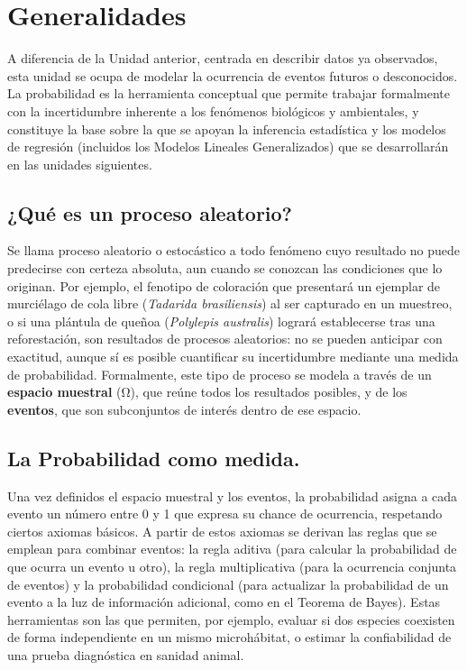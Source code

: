 \documentclass[
  spanish,
  letterpaper,
  DIV=11,
  numbers=noendperiod]{scrreprt}
\begin{document}
\section{Generalidades}\label{generalidades}

A diferencia de la Unidad anterior, centrada en describir datos ya
observados, esta unidad se ocupa de modelar la ocurrencia de eventos
futuros o desconocidos. La probabilidad es la herramienta conceptual que
permite trabajar formalmente con la incertidumbre inherente a los
fenómenos biológicos y ambientales, y constituye la base sobre la que se
apoyan la inferencia estadística y los modelos de regresión (incluidos
los Modelos Lineales Generalizados) que se desarrollarán en las unidades
siguientes.

\subsection{¿Qué es un proceso
aleatorio?}\label{quuxe9-es-un-proceso-aleatorio}

Se llama proceso aleatorio o estocástico a todo fenómeno cuyo resultado
no puede predecirse con certeza absoluta, aun cuando se conozcan las
condiciones que lo originan. Por ejemplo, el fenotipo de coloración que
presentará un ejemplar de murciélago de cola libre (\emph{Tadarida
brasiliensis}) al ser capturado en un muestreo, o si una plántula de
queñoa (\emph{Polylepis australis}) logrará establecerse tras una
reforestación, son resultados de procesos aleatorios: no se pueden
anticipar con exactitud, aunque sí es posible cuantificar su
incertidumbre mediante una medida de probabilidad. Formalmente, este
tipo de proceso se modela a través de un \textbf{espacio muestral} (Ω),
que reúne todos los resultados posibles, y de los \textbf{eventos}, que
son subconjuntos de interés dentro de ese espacio.

\subsection{La Probabilidad como
medida.}\label{la-probabilidad-como-medida.}

Una vez definidos el espacio muestral y los eventos, la probabilidad
asigna a cada evento un número entre 0 y 1 que expresa su chance de
ocurrencia, respetando ciertos axiomas básicos. A partir de estos
axiomas se derivan las reglas que se emplean para combinar eventos: la
regla aditiva (para calcular la probabilidad de que ocurra un evento u
otro), la regla multiplicativa (para la ocurrencia conjunta de eventos)
y la probabilidad condicional (para actualizar la probabilidad de un
evento a la luz de información adicional, como en el Teorema de Bayes).
Estas herramientas son las que permiten, por ejemplo, evaluar si dos
especies coexisten de forma independiente en un mismo microhábitat, o
estimar la confiabilidad de una prueba diagnóstica en sanidad animal.
\end{document}
